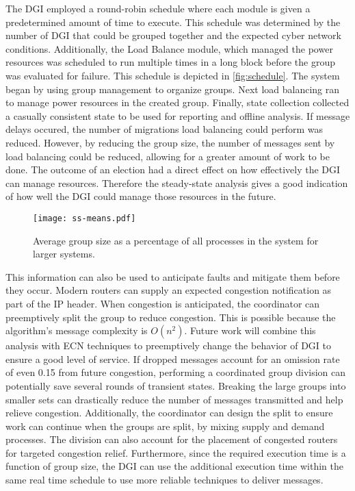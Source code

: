 The DGI employed a round-robin schedule where each module is given a predetermined amount of time to execute.
This schedule was determined by the number of DGI that could be grouped together and the expected cyber network conditions.
Additionally, the Load Balance module, which managed the power resources was scheduled to run multiple times in a long block before the group was evaluated for failure.
This schedule is depicted in \ref{fig:schedule}.
The system began by using group management to organize groups.
Next load balancing ran to manage power resources in the created group.
Finally, state collection collected a casually consistent state to be used for reporting and offline analysis.
If message delays occured, the number of migrations load balancing could perform was reduced.
However, by reducing the group size, the number of messages sent by load balancing could be reduced, allowing for a greater amount of work to be done.
The outcome of an election had a direct effect on how effectively the DGI can manage resources.
Therefore the steady-state analysis gives a good indication of how well the DGI could manage those resources in the future.

\begin{figure}
    \centering
    \texttt{[image: ss-means.pdf]}
    \caption{Average group size as a percentage of all processes in the system for larger systems.}
    \label{fig:ss-means}
\end{figure}

This information can also be used to anticipate faults and mitigate them before they occur.
Modern routers can supply an expected congestion notification as part of the IP header\cite{ECN2}.
When congestion is anticipated, the coordinator can preemptively split the group to reduce congestion.
This is possible because the algorithm's message complexity is $O(n^2)$.
Future work will combine this analysis with ECN techniques to preemptively change the behavior of DGI to ensure a good level of service.
If dropped messages account for an omission rate of even 0.15 from future congestion, performing a coordinated group division can potentially save several rounds of transient states.
Breaking the large groups into smaller sets can drastically reduce the number of messages transmitted and help relieve congestion.
Additionally, the coordinator can design the split to ensure work can continue when the groups are split, by mixing supply and demand processes.
The division can also account for the placement of congested routers for targeted congestion relief.
Furthermore, since the required execution time is a function of group size, the DGI can use the additional execution time within the same real time schedule to use more reliable techniques to deliver messages.


